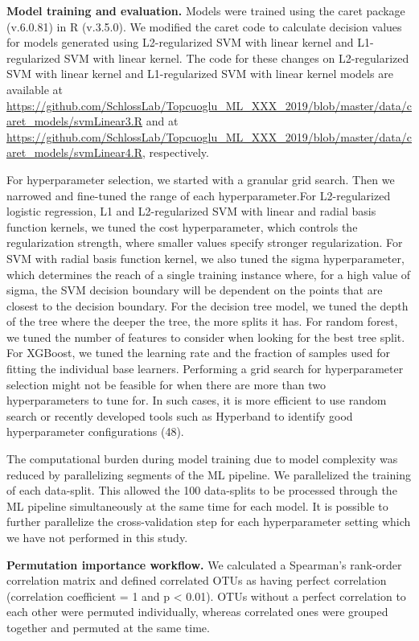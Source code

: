 \documentclass[
  11pt,
]{article}
\begin{document}
\textbf{Model training and evaluation.} Models were trained using the
caret package (v.6.0.81) in R (v.3.5.0). We modified the caret code to
calculate decision values for models generated using L2-regularized SVM
with linear kernel and L1-regularized SVM with linear kernel. The code
for these changes on L2-regularized SVM with linear kernel and
L1-regularized SVM with linear kernel models are available at
\url{https://github.com/SchlossLab/Topcuoglu_ML_XXX_2019/blob/master/data/caret_models/svmLinear3.R}
and at
\url{https://github.com/SchlossLab/Topcuoglu_ML_XXX_2019/blob/master/data/caret_models/svmLinear4.R},
respectively.

For hyperparameter selection, we started with a granular grid search.
Then we narrowed and fine-tuned the range of each hyperparameter.For
L2-regularized logistic regression, L1 and L2-regularized SVM with
linear and radial basis function kernels, we tuned the cost
hyperparameter, which controls the regularization strength, where
smaller values specify stronger regularization. For SVM with radial
basis function kernel, we also tuned the sigma hyperparameter, which
determines the reach of a single training instance where, for a high
value of sigma, the SVM decision boundary will be dependent on the
points that are closest to the decision boundary. For the decision tree
model, we tuned the depth of the tree where the deeper the tree, the
more splits it has. For random forest, we tuned the number of features
to consider when looking for the best tree split. For XGBoost, we tuned
the learning rate and the fraction of samples used for fitting the
individual base learners. Performing a grid search for hyperparameter
selection might not be feasible for when there are more than two
hyperparameters to tune for. In such cases, it is more efficient to use
random search or recently developed tools such as Hyperband to identify
good hyperparameter configurations (48).

The computational burden during model training due to model complexity
was reduced by parallelizing segments of the ML pipeline. We
parallelized the training of each data-split. This allowed the 100
data-splits to be processed through the ML pipeline simultaneously at
the same time for each model. It is possible to further parallelize the
cross-validation step for each hyperparameter setting which we have not
performed in this study.

\textbf{Permutation importance workflow.} We calculated a Spearman's
rank-order correlation matrix and defined correlated OTUs as having
perfect correlation (correlation coefficient = 1 and p \textless{}
0.01). OTUs without a perfect correlation to each other were permuted
individually, whereas correlated ones were grouped together and permuted
at the same time.
\end{document}
